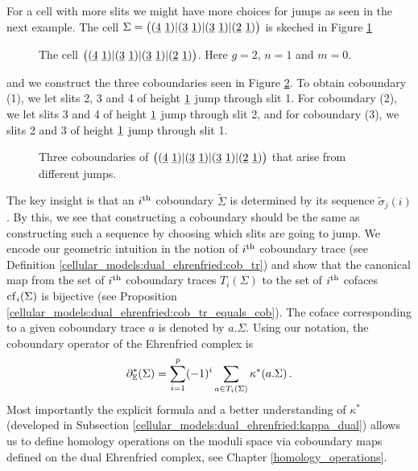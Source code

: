 For a cell with more slits we might have more choices for jumps as seen in the next example.
The cell $\Sigma = \big( (\underline{\smash{4}}\ \underline{\smash{1}}) | (\underline{\smash{3}}\ \underline{\smash{1}}) | (\underline{\smash{3}}\ \underline{\smash{1}}) | (\underline{\smash{2}}\ \underline{\smash{1}}) \big)$ is skeched in Figure \ref{cellular_models:dual_ehrenfried:motivate_more_coboundaries_pre}
\begin{figure}[ht]
\centering
{}
\caption{\label{cellular_models:dual_ehrenfried:motivate_more_coboundaries_pre}The cell $\big( (\ul4\ \ul1) | (\ul3\ \ul1) | (\ul3\ \ul1) | (\ul2\ \ul 1) \big)$. Here $g=2$, $n=1$ and $m=0$.}
\end{figure}
and we construct the three coboundaries seen in Figure \ref{cellular_models:dual_ehrenfried:motivate_more_coboundaries}.
To obtain coboundary (1), we let slits 2, 3 and 4 of height $\underline{\smash{1}}$ jump through slit 1.
For coboundary (2), we let slits 3 and 4 of height $\underline{\smash{1}}$ jump through slit 2,
and for coboundary (3), we slits 2  and 3 of height $\underline{\smash{1}}$ jump through slit 1.
\begin{figure}[ht]
\centering
{}
\caption{\label{cellular_models:dual_ehrenfried:motivate_more_coboundaries}Three coboundaries of $\big( (\ul4\ \ul1) | (\ul3\ \ul1) | (\ul3\ \ul1) | (\ul2\ \ul 1) \big)$ that arise from different jumps.}
\end{figure}

The key insight is that an $i^{\text{th}}$ coboundary $\tilde\Sigma$ is determined by its sequence $\tilde\sigma_j(i)$.
By this, we see that constructing a coboundary should be the same as constructing such a sequence by choosing which slits are going to jump.
We encode our geometric intuition in the notion of $i^{\text{th}}$ coboundary trace (see Definition \ref{cellular_models:dual_ehrenfried:cob_tr})
and show that the canonical map from the set of $i^{\text{th}}$ coboundary traces $T_i(\Sigma)$ to the set of $i^{\text{th}}$ cofaces $\operatorname{cf}_i(\Sigma)$ is bijective (see Proposition \ref{cellular_models:dual_ehrenfried:cob_tr_equals_cob}).
The coface corresponding to a given coboundary trace $a$ is denoted by $a.\Sigma$.
Using our notation, the coboundary operator of the Ehrenfried complex is
\[
    \partial_\mathbb E^\ast(\Sigma) = \sum_{i=1}^p (-1)^i \sum_{a \in T_i(\Sigma)} \kappa^\ast(a.\Sigma) \,.
\]
Most importantly the explicit formula and a better understanding of $\kappa^\ast$ (developed in Subsection \ref{cellular_models:dual_ehrenfried:kappa_dual})
allows us to define homology operations on the moduli space via coboundary maps defined on the dual Ehrenfried complex, see Chapter \ref{homology_operations}.

